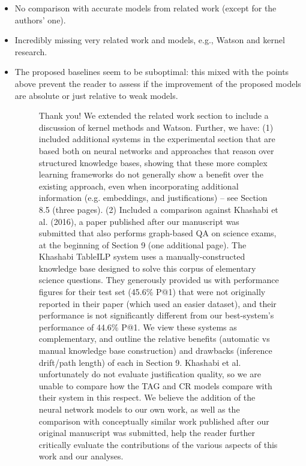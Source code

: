 \documentclass[10pt]{article}
\begin{document}
\begin{itemize}
\item No comparison with accurate models from related work (except for the
authors' one).
\item Incredibly missing very related work and models, e.g., Watson and kernel
research.
\item The proposed baselines seem to be suboptimal: this mixed with the points
above prevent the reader to assess if the improvement of the proposed models
are absolute or just relative to weak models.

\begin{figure}[H]
\caption{ Thank you! We extended the related work section to include a discussion of kernel methods and Watson. Further, we have: (1) included additional systems in the experimental section that are based both on neural networks and approaches that reason over structured knowledge bases, showing that these more complex learning frameworks do not generally show a benefit over the existing approach, even when incorporating additional information (e.g. embeddings, and justifications) -- see Section 8.5 (three pages). 
(2) Included a comparison against Khashabi et al. (2016), a paper published after our manuscript was submitted that also performs graph-based QA on science exams, at the beginning of Section 9 (one additional page).  The Khashabi TableILP system uses a manually-constructed knowledge base designed to solve this corpus of elementary science questions.  They generously provided us with performance figures for their test set (45.6\% P@1) that were not originally reported in their paper (which used an easier dataset), and their performance is not significantly different from our best-system's performance of 44.6\% P@1.  We view these systems as complementary, and outline the relative benefits (automatic vs manual knowledge base construction) and drawbacks (inference drift/path length) of each in Section 9.  Khashabi et al. unfortunately do not evaluate justification quality, so we are unable to compare how the TAG and CR models compare with their system in this respect. 
We believe the addition of the neural network models to our own work, as well as the comparison with conceptually similar work published after our original manuscript was submitted, help the reader further critically evaluate the contributions of the various aspects of this work and our analyses. }
\label{resp:comparison}
\end{figure}
\end{itemize}
\end{document}
